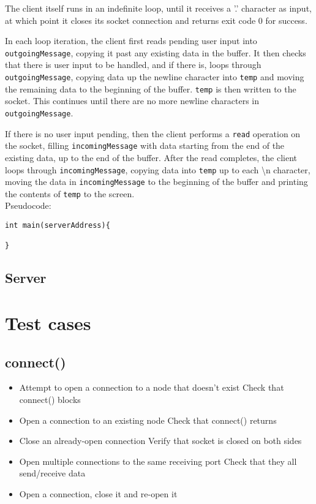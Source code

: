 \documentclass[]{article}
\begin{document}
The client itself runs in an indefinite loop, until it receives a '.' character as input, at which point it closes its socket connection and returns exit code 0 for success. 

In each loop iteration, the client first reads pending user input into \\ \texttt{outgoingMessage}, copying it past any existing data in the buffer. It then checks that there is user input to be handled, and if there is, loops through \texttt{outgoingMessage}, copying data up the newline character into \texttt{temp} and moving the remaining data to the beginning of the buffer. \texttt{temp} is then written to the socket. This continues until there are no more newline characters in \texttt{outgoingMessage}. 

If there is no user input pending, then the client performs a \texttt{read} operation on the socket, filling \texttt{incomingMessage} with data starting from the end of the existing data, up to the end of the buffer. After the read completes, the client loops through \texttt{incomingMessage}, copying data into \texttt{temp} up to each \textbackslash n character, moving the data in \texttt{incomingMessage} to the beginning of the buffer and printing the contents of \texttt{temp} to the screen. \\

\noindent Pseudocode:

\begin{lstlisting}
int main(serverAddress){
		
}
\end{lstlisting}
\subsection{Server}

\section{Test cases}
\subsection{connect()}
\begin{itemize}
	\item Attempt to open a connection to a node that doesn't exist
	\subitem Check that connect() blocks
	\item Open a connection to an existing node
	\subitem Check that connect() returns
	\item Close an already-open connection
	\subitem Verify that socket is closed on both sides
	\item Open multiple connections to the same receiving port
	\subitem Check that they all send/receive data
	\item Open a connection, close it and re-open it
\end{itemize}
\end{document}
